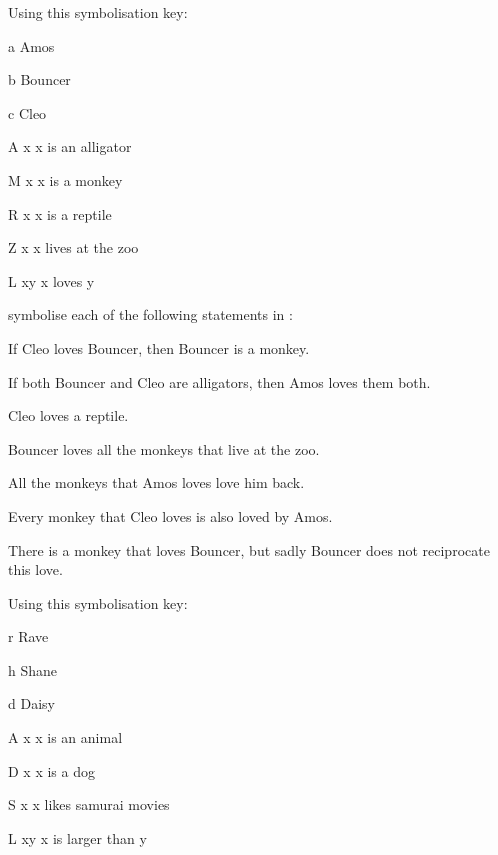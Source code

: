 \documentclass[PHIL101-Textbook.tex]{subfiles}
\begin{document}
\noindent\solutions
\problempart
Using this symbolisation key:
\begin{ekey}
\item[a] Amos
\item[b] Bouncer
\item[c] Cleo
\item[\atom A x ] x is an alligator
\item[\atom M x ] x is a monkey
\item[\atom R x ] x is a reptile
\item[\atom Z x ] x lives at the zoo
\item[\atom L xy ] x loves y
\end{ekey}
symbolise each of the following statements in \pl:
\begin{earg}
\item If Cleo loves Bouncer, then Bouncer is a monkey. 
\item If both Bouncer and Cleo are alligators, then Amos loves them both.
\item Cleo loves a reptile.
\item Bouncer loves all the monkeys that live at the zoo.
\item All the monkeys that Amos loves love him back.
\item Every monkey that Cleo loves is also loved by Amos.
\item There is a monkey that loves Bouncer, but sadly Bouncer does not reciprocate this love.
\end{earg}


\noindent\problempart 
Using this symbolisation key:
\begin{ekey}
\item[r] Rave
\item[h] Shane
\item[d] Daisy
\item[\atom A x] x is an animal
\item[\atom D x ] x is a dog
\item[\atom S x ] x likes samurai movies
\item[\atom L xy ] x is larger than y
\end{ekey}
\end{document}
